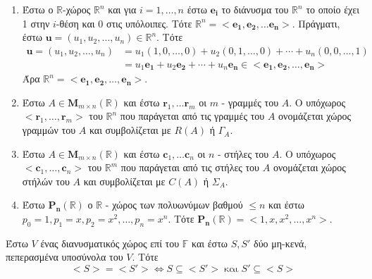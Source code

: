 \documentclass[a4paper,table]{report}
\begin{document}
\begin{examples}
\item {}
  \begin{enumerate}
    \item Έστω ο $ \mathbb{R} $-χώρος $ \mathbb{R}^{n} $ και για $ i= 1,\ldots,n $
      έστω $ \mathbf{e_{i}} $ το διάνυσμα του $ \mathbb{R}^{n} $ το οποίο έχει 
      1 στην $ i $-θέση και 0 στις υπόλοιπες. Τότε $ \mathbb{R}^{n} = 
      < \mathbf{e_{1}}, \mathbf{e_{2}}, \ldots \mathbf{e_{n}} >  $. 
      Πράγματι, έστω $ \mathbf{u} = (u_{1},u_{2},\ldots,u_{n}) \in 
      \mathbb{R}^{n} $. Τότε 
      \begin{align*}
        \mathbf{u} = (u_{1},u_{2},\ldots,u_{n}) 
                &=  u_{1} (1,0,\ldots,0) + u_{2} (0,1,\ldots,0) + 
                \cdots + u_{n} (0,0,\ldots,1) \\
                &= u_{1} \mathbf{e_{1}} + u_{2} \mathbf{e_{2}} + \cdots + u_{n} 
                \mathbf{e_{n}} \in < \mathbf{e_{1}}, \mathbf{e_{2}}, 
                \ldots, \mathbf{e_{n}} >  
      \end{align*} 
      Άρα $ \mathbb{R}^{n} = < \mathbf{e_{1}}, \mathbf{e_{2}}, 
      \ldots, \mathbf{e_{n}} >  $.
    \item Έστω $ A \in \textbf{M}_{m \times n}(\mathbb{R}) $ και έστω 
      $ \mathbf{r}_{1}, \ldots \mathbf{r}_{m} $ οι $m$ - γραμμές του $A$.  
      Ο υπόχωρος $ < \mathbf{r}_{1}, \ldots, \mathbf{r}_{m} >  $ του 
      $ \mathbb{R}^{n} $ που παράγεται από τις γραμμές του $A$ ονομάζεται 
      χώρος γραμμών του $A$ και συμβολίζεται με $ R(A) $ ή $ \Gamma_{A} $.
    \item Έστω $ A \in \textbf{M}_{m \times n}(\mathbb{R}) $ και έστω 
      $ \mathbf{c}_{1}, \ldots \mathbf{c}_{n} $ οι $n$ - στήλες του $A$.  
      Ο υπόχωρος $ < \mathbf{c}_{1}, \ldots, \mathbf{c}_{n} >  $ του 
      $ \mathbb{R}^{m} $ που παράγεται από τις στήλες του $A$ ονομάζεται 
      χώρος στήλών του $A$ και συμβολίζεται με $ C(A) $ ή $ \Sigma_{A} $.
    \item Έστω $ \mathbf{P_{n}}(\mathbb{R}) $ ο $ \mathbb{R} $ - χώρος των 
      πολυωνύμων βαθμού $ \leq n $ και έστω $ p_{0} = 1, p_{1}=x, p_{2}=x^{2}, 
      \ldots, p_{n}=x^{n} $. Τότε $ \mathbf{P_{n}}(\mathbb{R}) = 
      < 1,x,x^{2},\ldots,x^{n}> $.
  \end{enumerate}
\end{examples}

\begin{thm}\label{thm:more}
  Έστω $V$ ένας διανυσματικός χώρος επί του $ \mathbb{F} $ και έστω $ S, S' $ δύο 
  μη-κενά, πεπερασμένα υποσύνολα του $V$. Τότε 
  \[ < S > = < S' > \Leftrightarrow S \subseteq < S' >  \; \text{και} \; 
  S' \subseteq < S >  \]
\end{thm}
\end{document}
